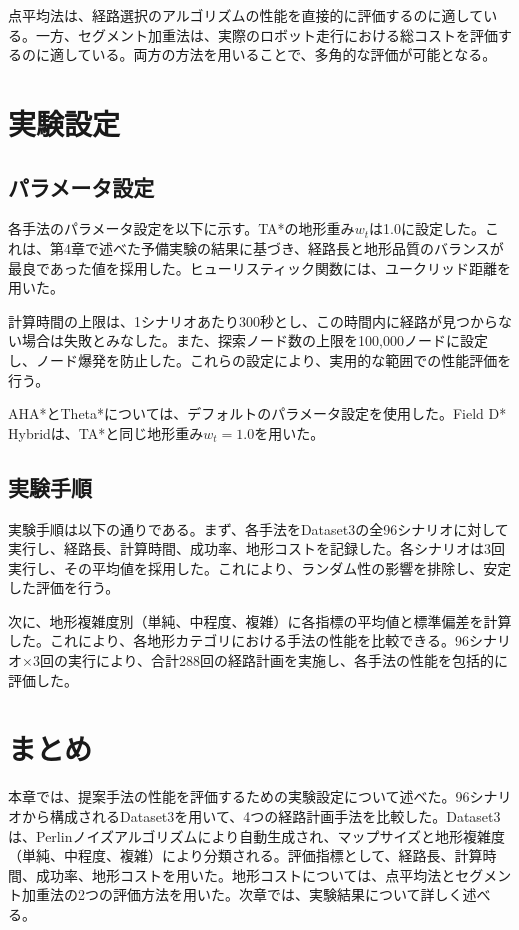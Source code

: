 点平均法は、経路選択のアルゴリズムの性能を直接的に評価するのに適している。一方、セグメント加重法は、実際のロボット走行における総コストを評価するのに適している。両方の方法を用いることで、多角的な評価が可能となる。

\section{実験設定}

\subsection{パラメータ設定}

各手法のパラメータ設定を以下に示す。TA*の地形重み$w_t$は1.0に設定した。これは、第4章で述べた予備実験の結果に基づき、経路長と地形品質のバランスが最良であった値を採用した。ヒューリスティック関数には、ユークリッド距離を用いた。

計算時間の上限は、1シナリオあたり300秒とし、この時間内に経路が見つからない場合は失敗とみなした。また、探索ノード数の上限を100,000ノードに設定し、ノード爆発を防止した。これらの設定により、実用的な範囲での性能評価を行う。

AHA*とTheta*については、デフォルトのパラメータ設定を使用した。Field D* Hybridは、TA*と同じ地形重み$w_t=1.0$を用いた。

\subsection{実験手順}

実験手順は以下の通りである。まず、各手法をDataset3の全96シナリオに対して実行し、経路長、計算時間、成功率、地形コストを記録した。各シナリオは3回実行し、その平均値を採用した。これにより、ランダム性の影響を排除し、安定した評価を行う。

次に、地形複雑度別（単純、中程度、複雑）に各指標の平均値と標準偏差を計算した。これにより、各地形カテゴリにおける手法の性能を比較できる。96シナリオ×3回の実行により、合計288回の経路計画を実施し、各手法の性能を包括的に評価した。

\section{まとめ}

本章では、提案手法の性能を評価するための実験設定について述べた。96シナリオから構成されるDataset3を用いて、4つの経路計画手法を比較した。Dataset3は、Perlinノイズアルゴリズムにより自動生成され、マップサイズと地形複雑度（単純、中程度、複雑）により分類される。評価指標として、経路長、計算時間、成功率、地形コストを用いた。地形コストについては、点平均法とセグメント加重法の2つの評価方法を用いた。次章では、実験結果について詳しく述べる。

